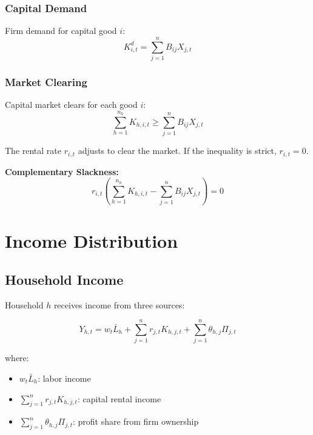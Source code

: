 \documentclass[12pt,a4paper]{article}
\theoremstyle{definition}
\theoremstyle{remark}
\begin{document}
\subsubsection{Capital Demand}

Firm demand for capital good $i$:
\begin{equation}
    K_{i,t}^d = \sum_{j=1}^n B_{ij} X_{j,t}
\end{equation}

\subsubsection{Market Clearing}

Capital market clears for each good $i$:
\begin{equation}
    \sum_{h=1}^{n_h} K_{h,i,t} \geq \sum_{j=1}^n B_{ij} X_{j,t}
\end{equation}

The rental rate $r_{i,t}$ adjusts to clear the market. If the inequality is strict, $r_{i,t} = 0$.

\textbf{Complementary Slackness:}
\begin{equation}
    r_{i,t} \left(\sum_{h=1}^{n_h} K_{h,i,t} - \sum_{j=1}^n B_{ij} X_{j,t}\right) = 0
\end{equation}

\section{Income Distribution}

\subsection{Household Income}

Household $h$ receives income from three sources:

\begin{equation}
    Y_{h,t} = w_t \bar{L}_h + \sum_{j=1}^n r_{j,t} K_{h,j,t} + \sum_{j=1}^n \theta_{h,j} \Pi_{j,t}
\end{equation}

where:
\begin{itemize}
    \item $w_t \bar{L}_h$: labor income
    \item $\sum_{j=1}^n r_{j,t} K_{h,j,t}$: capital rental income
    \item $\sum_{j=1}^n \theta_{h,j} \Pi_{j,t}$: profit share from firm ownership
\end{itemize}
\end{document}

